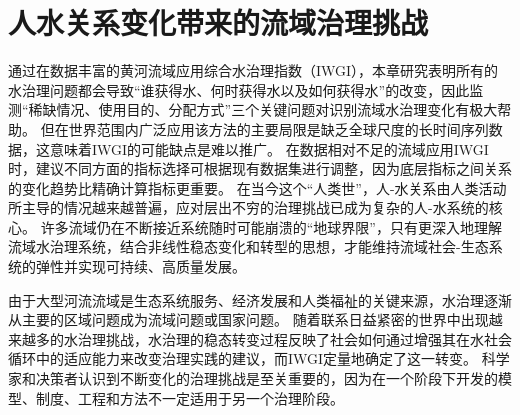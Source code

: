\section{人水关系变化带来的流域治理挑战}

通过在数据丰富的黄河流域应用综合水治理指数（IWGI），本章研究表明所有的水治理问题都会导致“谁获得水、何时获得水以及如何获得水”的改变，因此监测“稀缺情况、使用目的、分配方式”三个关键问题对识别流域水治理变化有极大帮助。
但在世界范围内广泛应用该方法的主要局限是缺乏全球尺度的长时间序列数据，这意味着IWGI的可能缺点是难以推广。
在数据相对不足的流域应用IWGI时，建议不同方面的指标选择可根据现有数据集进行调整，因为底层指标之间关系的变化趋势比精确计算指标更重要。
在当今这个“人类世”，人-水关系由人类活动所主导的情况越来越普遍，应对层出不穷的治理挑战已成为复杂的人-水系统的核心\cite{cumming2018,cumming2014,jaeger2019}。
许多流域仍在不断接近系统随时可能崩溃的“地球界限”\cite{gleeson2020, wang-erlandsson2022}，只有更深入地理解流域水治理系统，结合非线性稳态变化和转型的思想，才能维持流域社会-生态系统的弹性并实现可持续、高质量发展\cite{falkenmark2019}。

由于大型河流流域是生态系统服务、经济发展和人类福祉的关键来源，水治理逐渐从主要的区域问题成为流域问题或国家问题\cite{best2019,best2020}。
随着联系日益紧密的世界中出现越来越多的水治理挑战，水治理的稳态转变过程反映了社会如何通过增强其在水社会循环中的适应能力来改变治理实践的建议，而IWGI定量地确定了这一转变\cite{loch2020,turton1999,diaz2019}。
科学家和决策者认识到不断变化的治理挑战是至关重要的，因为在一个阶段下开发的模型、制度、工程和方法不一定适用于另一个治理阶段\cite{reyers2018}。
